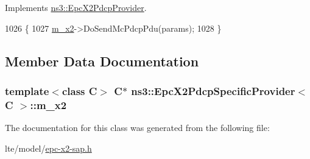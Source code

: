 Implements \hyperlink{classns3_1_1EpcX2PdcpProvider_a3e7d70dc42d16cc0f76758439a9c5b57}{ns3\+::\+Epc\+X2\+Pdcp\+Provider}.


\begin{DoxyCode}
1026 \{
1027   \hyperlink{classns3_1_1EpcX2PdcpSpecificProvider_a38b6843ed2e3e63ced767795bd90c482}{m\_x2}->DoSendMcPdcpPdu(params);
1028 \}
\end{DoxyCode}


\subsection{Member Data Documentation}
\subsubsection[{\texorpdfstring{m\+\_\+x2}{m_x2}}]{\setlength{\rightskip}{0pt plus 5cm}template$<$class C$>$ {\bf C}$\ast$ {\bf ns3\+::\+Epc\+X2\+Pdcp\+Specific\+Provider}$<$ {\bf C} $>$\+::m\+\_\+x2\hspace{0.3cm}{\ttfamily [private]}}\hypertarget{classns3_1_1EpcX2PdcpSpecificProvider_a38b6843ed2e3e63ced767795bd90c482}{}\label{classns3_1_1EpcX2PdcpSpecificProvider_a38b6843ed2e3e63ced767795bd90c482}


The documentation for this class was generated from the following file\+:\begin{DoxyCompactItemize}
\item 
lte/model/\hyperlink{epc-x2-sap_8h}{epc-\/x2-\/sap.\+h}\end{DoxyCompactItemize}
